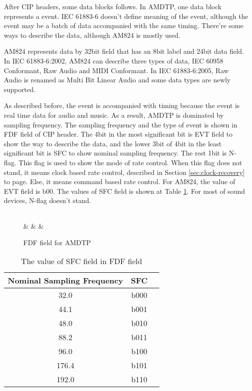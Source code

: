 \documentclass[onecolumn]{article}
\begin{document}
After CIP headers, some data blocks follows. In AMDTP, one data block represents a event. IEC 61883-6\cite{iec61883-6-1, iec61883-6-2} doesn't define meaning of the event, although the event may be a batch of data accompanied with the same timing. There're some ways to describe the data, although AM824 is mostly used.

AM824 represents data by 32bit field that has an 8bit label and 24bit data field\cite{iec61883-6-2}. In IEC 61883-6:2002\cite{iec61883-6-1}, AM824 can describe three types of data, IEC 60958 Conformant, Raw Audio and MIDI Conformant. In IEC 61883-6:2005\cite{iec61883-6-2}, Raw Audio is renamed as Multi Bit Linear Audio and some data types are newly supported.

As described before, the event is accompanied with timing because the event is real time data for audio and music. As a result, AMDTP is dominated by sampling frequency. The sampling frequency and the type of event is shown in FDF field of CIP header. The 4bit in the most significant bit is EVT field to show the way to describe the data, and the lower 3bit of 4bit in the least significant bit is SFC to show nominal sampling frequency. The rest 1bit is N-flag. This flag is used to show the mode of rate control. When this flag does not stand, it means clock based rate control, described in Section \ref{sec:clock-recovery} to page\pageref{sec:clock-recovery}. Else, it means command based rate control\cite{iec61883-6-2, avc-rate-control}. For AM824, the value of EVT field is b00. The values of SFC field is shown at Table \ref{tbl:sfc-fdf}. For most of sound devices, N-flag doesn't stand.

\begin{figure}[H]
\centering
\begin{bytefield}[bitwidth=auto,endianness=big]{8}
	 \\
	 &
	 &
	 &
\end{bytefield}
\caption{FDF field for AMDTP}
\label{amdtp-fdf}
\end{figure}

\begin{table}[H]
	\centering
	\caption{{The value of SFC field in FDF field}}
	\label{tbl:sfc-fdf}
	\begin{tabular}{ccc} \toprule
		Nominal Sampling Frequency & SFC \\ \midrule
		32.0	& b000 \\
		44.1	& b001 \\
		48.0	& b010 \\
		88.2	& b011 \\
		96.0	& b100 \\
		176.4	& b101 \\
		192.0	& b110 \\ \bottomrule
	\end{tabular}
\end{table}
\end{document}
